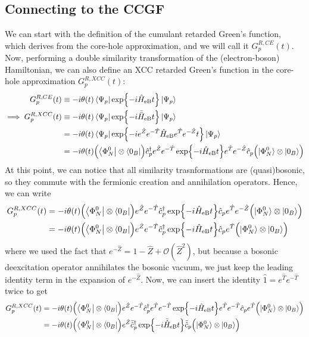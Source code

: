 \subsection{Connecting to the CCGF}
We can start with the definition of the cumulant retarded Green's function, which derives from the core-hole approximation, and we will call it $G_{p}^{R,CE}(t)$. Now, performing a double similarity transformation of the (electron-boson) Hamiltonian, we can also define an XCC retarded Green's function in the core-hole approximation $G_{p}^{R,XCC}(t)$:
\begin{align}
G_p^{R,CE}(t) &\equiv -i \theta(t) \bra{\Psi_p} \exp{-i\hat{H}_{\text{eB}} t} \ket{\Psi_p} \\
\implies G_p^{R,XCC}(t) &\equiv -i \theta(t) \bra{\Psi_p}  \exp{-i \bar{\bar{H}}_{\text{eB}} t}  \ket{\Psi_p} \\
&= -i \theta(t) \bra{\Psi_p}  \exp{-i e^{\hat{Z}} e^{-\hat{T}} \hat{H}_{\text{eB}} e^{\hat{T}}e^{-\hat{Z}} t}  \ket{\Psi_p} \\
&= -i \theta(t) \Bigl(\bra{\Phi^0_{N}}\otimes\bra{0_B}\Bigr)  \hat{c}_p^\dagger e^{\hat{Z}} e^{-\hat{T}} \exp{-i \hat{H}_{\text{eB}} t} e^{\hat{T}}e^{-\hat{Z}} \hat{c}_p \Bigl(|\Phi^0_{N}\rangle \otimes |0_B\rangle\Bigr)
\end{align}
At this point, we can notice that all similarity trasnformations are (quasi)bosonic, so they commute with the fermionic creation and annihilation operators. Hence, we can write
\begin{align}
G_p^{R,XCC}(t) &= -i \theta(t) \Bigl(\bra{\Phi^0_{N}}\otimes\bra{0_B}\Bigr) e^{\hat{Z}} e^{-\hat{T}} \hat{c}_p^\dagger \exp{-i \hat{H}_{\text{eB}} t} \hat{c}_p e^{\hat{T}}e^{-\hat{Z}} \Bigl(|\Phi^0_{N}\rangle \otimes |0_B\rangle\Bigr) \\
&= -i \theta(t) \Bigl(\bra{\Phi^0_{N}}\otimes\bra{0_B}\Bigr) e^{\hat{Z}} e^{-\hat{T}} \hat{c}_p^\dagger \exp{-i \hat{H}_{\text{eB}} t} \hat{c}_p e^{\hat{T}} \Bigl(|\Phi^0_{N}\rangle \otimes |0_B\rangle\Bigr) \\
\end{align}
where we used the fact that $e^{-\hat{Z}}=1-\hat{Z}+\mathcal{O}(\hat{Z}^2)$, but because a bosonic deexcitation operator annihilates the bosonic vacuum, we just keep the leading identity term in the expansion of $e^{-\hat{Z}}$. Now, we can insert the identity $\hat{1} = e^{\hat{T}} e^{-\hat{T}}$ twice to get
\begin{align}
G_p^{R,XCC}(t) &= -i \theta(t) \Bigl(\bra{\Phi^0_{N}}\otimes\bra{0_B}\Bigr) e^{\hat{Z}} e^{-\hat{T}} \hat{c}_p^\dagger e^{\hat{T}} e^{-\hat{T}} \exp{-i \hat{H}_{\text{eB}} t} e^{\hat{T}} e^{-\hat{T}} \hat{c}_p e^{\hat{T}} \Bigl(|\Phi^0_{N}\rangle \otimes |0_B\rangle\Bigr) \\
&= -i \theta(t) \Bigl(\bra{\Phi^0_{N}}\otimes\bra{0_B}\Bigr) e^{\hat{Z}} \bar{\hat{c}}_p^\dagger  \exp{-i \bar{\hat{H}}_{\text{eB}} t} \bar{\hat{c}}_p \Bigl(|\Phi^0_{N}\rangle \otimes |0_B\rangle\Bigr) 
\end{align}
